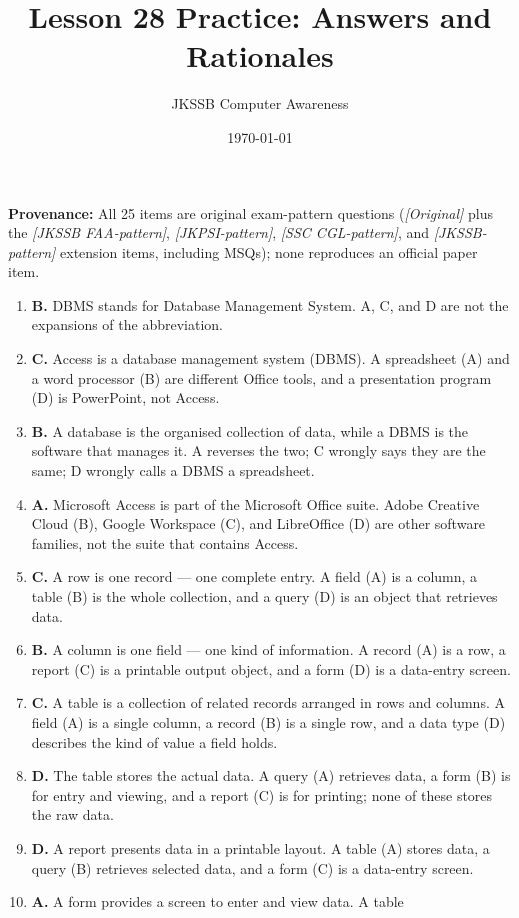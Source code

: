 \documentclass[11pt]{article}
\title{Lesson 28 Practice: Answers and Rationales}
\author{JKSSB Computer Awareness}
\date{\today}
\begin{document}
\maketitle
\noindent\textbf{Provenance:} All 25 items are original exam-pattern questions (\textit{[Original]} plus the \textit{[JKSSB FAA-pattern]}, \textit{[JKPSI-pattern]}, \textit{[SSC CGL-pattern]}, and \textit{[JKSSB-pattern]} extension items, including MSQs); none reproduces an official paper item.
\begin{enumerate}[label=\textbf{Q\arabic*.}, leftmargin=*]
\item \textbf{B.} DBMS stands for Database Management System. A, C, and D are
  not the expansions of the abbreviation.
\item \textbf{C.} Access is a database management system (DBMS). A
  spreadsheet (A) and a word processor (B) are different Office tools, and a
  presentation program (D) is PowerPoint, not Access.
\item \textbf{B.} A database is the organised collection of data, while a
  DBMS is the software that manages it. A reverses the two; C wrongly says
  they are the same; D wrongly calls a DBMS a spreadsheet.
\item \textbf{A.} Microsoft Access is part of the Microsoft Office suite.
  Adobe Creative Cloud (B), Google Workspace (C), and LibreOffice (D) are
  other software families, not the suite that contains Access.
\item \textbf{C.} A row is one record --- one complete entry. A field (A) is
  a column, a table (B) is the whole collection, and a query (D) is an
  object that retrieves data.
\item \textbf{B.} A column is one field --- one kind of information. A record
  (A) is a row, a report (C) is a printable output object, and a form (D) is
  a data-entry screen.
\item \textbf{C.} A table is a collection of related records arranged in rows
  and columns. A field (A) is a single column, a record (B) is a single row,
  and a data type (D) describes the kind of value a field holds.
\item \textbf{D.} The table stores the actual data. A query (A) retrieves
  data, a form (B) is for entry and viewing, and a report (C) is for
  printing; none of these stores the raw data.
\item \textbf{D.} A report presents data in a printable layout. A table (A)
  stores data, a query (B) retrieves selected data, and a form (C) is a
  data-entry screen.
\item \textbf{A.} A form provides a screen to enter and view data. A table

\end{enumerate}
\end{document}
